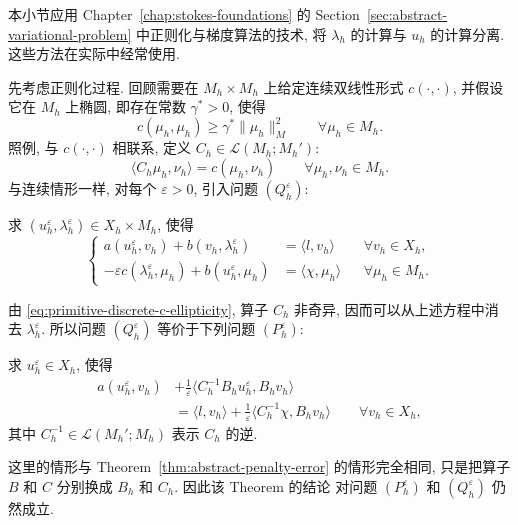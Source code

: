 本小节应用 Chapter~\ref{chap:stokes-foundations} 的 Section~\ref{sec:abstract-variational-problem}
中正则化与梯度算法的技术, 将 $\lambda_h$ 的计算与 $u_h$ 的计算分离.
这些方法在实际中经常使用.

先考虑正则化过程. 回顾需要在 $M_h\times M_h$ 上给定连续双线性形式
$c(\cdot,\cdot)$, 并假设它在 $M_h$ 上椭圆, 即存在常数 $\gamma^*>0$, 使得
\begin{equation}\label{eq:primitive-discrete-c-ellipticity}
c(\mu_h,\mu_h)\geq\gamma^*\|\mu_h\|_M^2
\qquad\forall\mu_h\in M_h.
\end{equation}
照例, 与 $c(\cdot,\cdot)$ 相联系, 定义
$C_h\in\mathcal L(M_h;M_h')$:
\[
\langle C_h\mu_h,\nu_h\rangle=c(\mu_h,\nu_h)
\qquad\forall\mu_h,\nu_h\in M_h.
\]
与连续情形一样, 对每个 $\varepsilon>0$, 引入问题 $(Q_h^\varepsilon)$:

求 $(u_h^\varepsilon,\lambda_h^\varepsilon)\in X_h\times M_h$, 使得
\begin{equation}\label{eq:primitive-discrete-penalty-system}
\left\{
\begin{aligned}
a(u_h^\varepsilon,v_h)+b(v_h,\lambda_h^\varepsilon)
&=\langle l,v_h\rangle
&&\forall v_h\in X_h,\\
-\varepsilon c(\lambda_h^\varepsilon,\mu_h)
+b(u_h^\varepsilon,\mu_h)
&=\langle\chi,\mu_h\rangle
&&\forall\mu_h\in M_h.
\end{aligned}
\right.
\end{equation}

由 \eqref{eq:primitive-discrete-c-ellipticity}, 算子 $C_h$ 非奇异,
因而可以从上述方程中消去 $\lambda_h^\varepsilon$.
所以问题 $(Q_h^\varepsilon)$ 等价于下列问题 $(P_h^\varepsilon)$:

求 $u_h^\varepsilon\in X_h$, 使得
\begin{equation}\label{eq:primitive-discrete-penalty-reduced}
\begin{split}
a(u_h^\varepsilon,v_h)
&+\frac{1}{\varepsilon}
\langle C_h^{-1}B_hu_h^\varepsilon,B_hv_h\rangle\\
&=\langle l,v_h\rangle
+\frac{1}{\varepsilon}\langle C_h^{-1}\chi,B_hv_h\rangle
\qquad\forall v_h\in X_h,
\end{split}
\end{equation}
其中 $C_h^{-1}\in\mathcal L(M_h';M_h)$ 表示 $C_h$ 的逆.

这里的情形与 Theorem~\ref{thm:abstract-penalty-error} 的情形完全相同,
只是把算子 $B$ 和 $C$ 分别换成 $B_h$ 和 $C_h$. 因此该 Theorem 的结论
对问题 $(P_h^\varepsilon)$ 和 $(Q_h^\varepsilon)$ 仍然成立.

